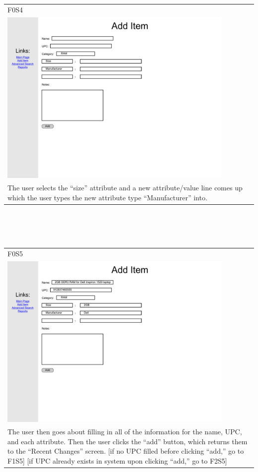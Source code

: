 \documentclass{article}
\begin{document}
~\\
\begin{tabular}{ p{4.5in} }
F0S4\\
\includegraphics[keepaspectratio, width=4.5in]{addItemF0S4.pdf} \\
The user selects the ``size'' attribute and a new attribute/value line comes up which the user types the new attribute type ``Manufacturer'' into.
\end{tabular}\\
~\\
~\\
\begin{tabular}{ p{4.5in} }
F0S5\\
\includegraphics[keepaspectratio, width=4.5in]{addItemF0S5.pdf}\\
The user then goes about filling in all of the information for the name, UPC, and each attribute. Then the user clicks the ``add'' button, which returns them to the ``Recent Changes'' screen. [if no UPC filled before clicking ``add,'' go to F1S5] [if UPC already exists in system upon clicking ``add,'' go to F2S5] 
\end{tabular}\\
\end{document}
